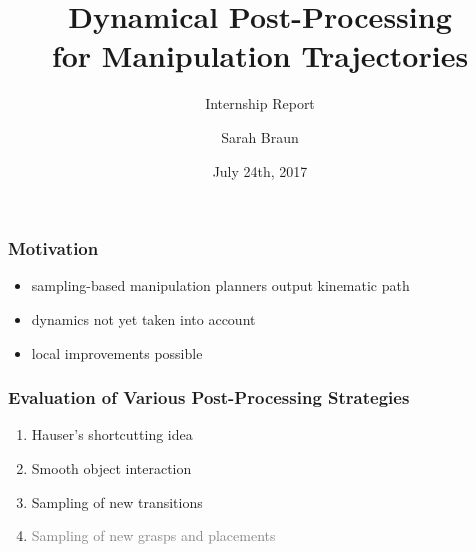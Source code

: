 \documentclass[12pt, %
			  t     %
]{beamer}%
\title{Dynamical Post-Processing\\ for Manipulation Trajectories}%
\subtitle{Internship Report}%
\author{Sarah Braun}%
\institute[TU München]{Technische Universität München}%
\date{July 24th, 2017}%
\begin{document}

\begin{frame}[plain]
  \titlepage
\end{frame}

\begin{frame}
\frametitle{Motivation}
\begin{itemize}
\item sampling-based manipulation planners output kinematic path
\item dynamics not yet taken into account
\item local improvements possible
\end{itemize}
\end{frame}



\begin{frame}
  \frametitle{Evaluation of Various Post-Processing Strategies}
  \begin{enumerate}
  \item Hauser's shortcutting idea
  \item Smooth object interaction
  \item Sampling of new transitions
  \item \textcolor{gray}{Sampling of new grasps and placements}
  \end{enumerate}
\end{frame}
\end{document}
